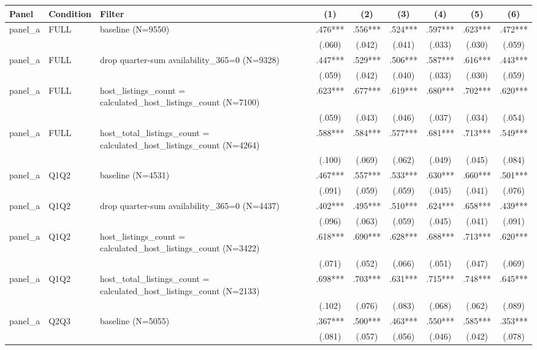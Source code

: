 \begin{tabular}{lllcccccc}
\hline
Panel & Condition & Filter & (1) & (2) & (3) & (4) & (5) & (6) \\
\hline
panel\_a & FULL & baseline (N=9550) & .476*** & .556*** & .524*** & .597*** & .623*** & .472***
\\
 &  &  & (.060) & (.042) & (.041) & (.033) & (.030) & (.059)
\\
panel\_a & FULL & drop quarter-sum availability\_365=0 (N=9328) & .447*** & .529*** & .506*** & .587*** & .616*** & .443***
\\
 &  &  & (.059) & (.042) & (.040) & (.033) & (.030) & (.059)
\\
panel\_a & FULL & host\_listings\_count = calculated\_host\_listings\_count (N=7100) & .623*** & .677*** & .619*** & .680*** & .702*** & .620***
\\
 &  &  & (.059) & (.043) & (.046) & (.037) & (.034) & (.054)
\\
panel\_a & FULL & host\_total\_listings\_count = calculated\_host\_listings\_count (N=4264) & .588*** & .584*** & .577*** & .681*** & .713*** & .549***
\\
 &  &  & (.100) & (.069) & (.062) & (.049) & (.045) & (.084)
\\
panel\_a & Q1Q2 & baseline (N=4531) & .467*** & .557*** & .533*** & .630*** & .660*** & .501***
\\
 &  &  & (.091) & (.059) & (.059) & (.045) & (.041) & (.076)
\\
panel\_a & Q1Q2 & drop quarter-sum availability\_365=0 (N=4437) & .402*** & .495*** & .510*** & .624*** & .658*** & .439***
\\
 &  &  & (.096) & (.063) & (.059) & (.045) & (.041) & (.091)
\\
panel\_a & Q1Q2 & host\_listings\_count = calculated\_host\_listings\_count (N=3422) & .618*** & .690*** & .628*** & .688*** & .713*** & .620***
\\
 &  &  & (.071) & (.052) & (.066) & (.051) & (.047) & (.069)
\\
panel\_a & Q1Q2 & host\_total\_listings\_count = calculated\_host\_listings\_count (N=2133) & .698*** & .703*** & .631*** & .715*** & .748*** & .645***
\\
 &  &  & (.102) & (.076) & (.083) & (.068) & (.062) & (.089)
\\
panel\_a & Q2Q3 & baseline (N=5055) & .367*** & .500*** & .463*** & .550*** & .585*** & .353***
\\
 &  &  & (.081) & (.057) & (.056) & (.046) & (.042) & (.078)
\\

\end{tabular}
